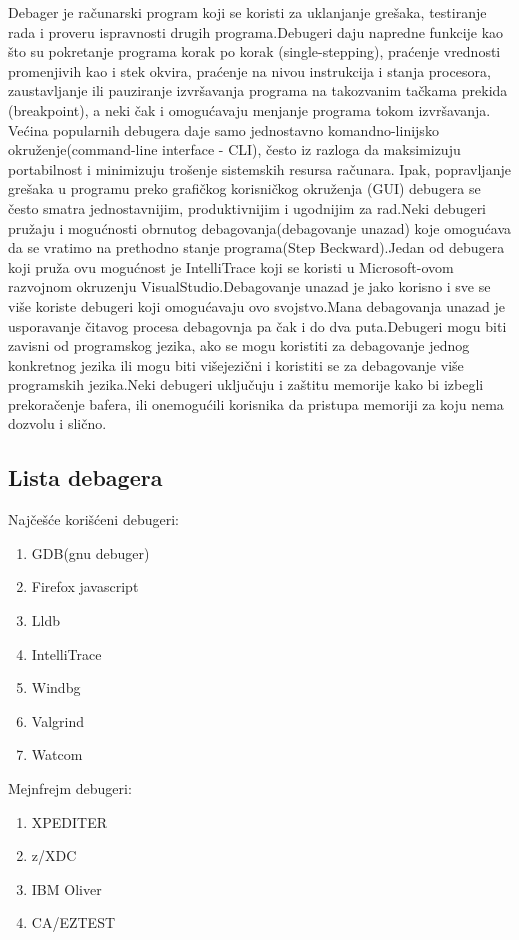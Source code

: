 \documentclass[a4paper]{article}
\begin{document}
Debager je računarski program koji se koristi za uklanjanje grešaka, testiranje rada i proveru ispravnosti drugih programa.Debugeri daju napredne funkcije kao što su pokretanje programa korak po korak (single-stepping), praćenje vrednosti promenjivih kao i stek okvira, praćenje na nivou instrukcija i stanja procesora, zaustavljanje ili pauziranje izvršavanja programa na takozvanim tačkama prekida (breakpoint), a neki čak i omogućavaju menjanje programa tokom izvršavanja.\\
\indent Većina popularnih debugera daje samo jednostavno komandno-linijsko okruženje(command-line interface - CLI), često iz razloga da maksimizuju portabilnost i minimizuju trošenje sistemskih resursa računara. Ipak, popravljanje grešaka u programu preko grafičkog korisničkog okruženja (GUI) debugera se često smatra jednostavnijim, produktivnijim i ugodnijim za rad.Neki debugeri pružaju i mogućnosti obrnutog debagovanja(debagovanje unazad) koje omogućava da se vratimo na prethodno stanje programa(Step Beckward).Jedan od debugera koji pruža ovu mogućnost je IntelliTrace koji se koristi u Microsoft-ovom razvojnom okruzenju VisualStudio.Debagovanje unazad je jako korisno i sve se više koriste debugeri koji omogućavaju ovo svojstvo.Mana debagovanja unazad je usporavanje čitavog procesa debagovnja pa čak i do dva puta.Debugeri mogu biti zavisni od programskog jezika, ako se mogu koristiti za debagovanje jednog konkretnog jezika ili mogu biti višejezični i koristiti se za debagovanje više programskih jezika.Neki debugeri uključuju i zaštitu memorije kako bi izbegli prekoračenje bafera, ili onemogućili korisnika da pristupa memoriji za koju nema dozvolu i slično.

\subsection{Lista debagera}
\label{sec:Lista debagera}

Najčešće korišćeni debugeri:
\begin{enumerate}
	\item GDB(gnu debuger)
	\item Firefox javascript 
	\item Lldb
	\item IntelliTrace
	\item Windbg
	\item Valgrind
	\item Watcom
\end{enumerate}
Mejnfrejm debugeri:
\begin{enumerate}
	\item XPEDITER
	\item z/XDC
	\item IBM Oliver
	\item CA/EZTEST
\end{enumerate}
\end{document}
